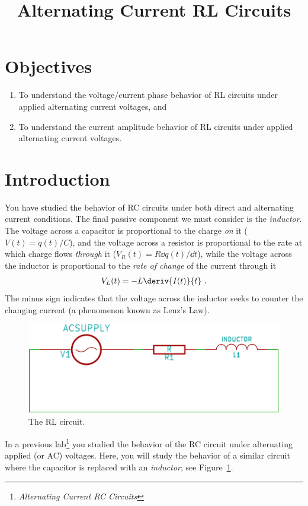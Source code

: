 \documentclass[12pt]{article}
\title{Alternating Current RL Circuits}
\author{}
\date{}
\begin{document}
\maketitle

\section{Objectives}
\label{sec:objectives}

\begin{enumerate}
\item To understand the voltage/current phase behavior of RL circuits
  under applied alternating current voltages, and
\item To understand the current amplitude behavior of RL circuits
  under applied alternating current voltages.
\end{enumerate}

\section{Introduction}
\label{sec:introduction}

You have studied the behavior of RC circuits under both direct and
alternating current conditions.  The final passive component we must
consider is the \textit{inductor}.  The voltage across a capacitor is
proportional to the charge \textit{on} it ($V(t) = q(t)/C$), and the
voltage across a resistor is proportional to the rate at which charge
flows \textit{through} it ($V_R(t) = R \dd q(t)/\dd t$), while the
voltage across the inductor is proportional to the \textit{rate of
  change} of the current through it
\begin{gather*}
  V_L(t) = - L \deriv{I(t)}{t}\ .
\end{gather*}
The minus sign indicates that the voltage across the inductor seeks to
counter the changing current (a phenomenon known as Lenz's Law).

\begin{figure}
  \centering
  \includegraphics[width=2\textwidth/3]{figures/rl-circuit}
  \caption{The RL circuit.}
  \label{fig:rlcircuit}
\end{figure}
In a previous lab\footnote{\textit{Alternating Current RC Circuits}}
you studied the behavior of the RC circuit under alternating applied
(or AC) voltages.  Here, you will study the behavior of a similar
circuit where the capacitor is replaced with an \textit{inductor}; see
Figure~\ref{fig:rlcircuit}. 
\end{document}
